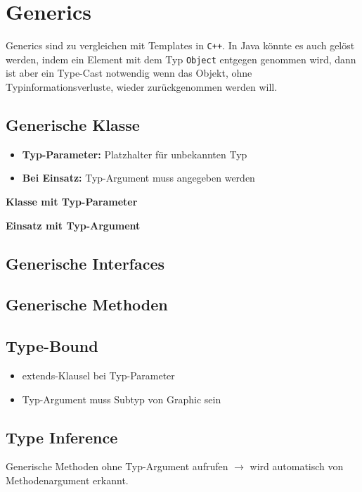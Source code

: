 \section*{Generics}
	Generics sind zu vergleichen mit Templates in \texttt{C++}. In Java könnte es auch gelöst werden, indem ein Element mit dem Typ \texttt{Object} entgegen genommen wird, dann ist aber ein Type-Cast notwendig wenn das Objekt, ohne Typinformationsverluste, wieder zurückgenommen werden will.
	\subsection*{Generische Klasse}
		\begin{minipage}[t]{8.5cm}
			\begin{itemize}[noitemsep]
				\item \textbf{Typ-Parameter:} Platzhalter für unbekannten Typ
				\item \textbf{Bei Einsatz:} Typ-Argument muss angegeben werden
			\end{itemize}
		\end{minipage}
		\hspace*{0.25cm}
		\begin{minipage}[t]{4.2cm}
			\textbf{Klasse mit Typ-Parameter}	
			
		\end{minipage}
		\hspace*{0.25cm}
		\begin{minipage}[t]{5.3cm}
			\textbf{Einsatz mit Typ-Argument}
			
		\end{minipage}
	\begin{minipage}[t]{7cm}
		\subsection*{Generische Interfaces}
		
	\end{minipage}
	\hspace*{0.5cm}
	\begin{minipage}[t]{11.3cm}
		\subsection*{Generische Methoden}
		
	\end{minipage}
	\begin{minipage}[t]{9cm}
		\subsection*{Type-Bound}
		\begin{itemize}[noitemsep]
			\item extends-Klausel bei Typ-Parameter
			\item Typ-Argument muss Subtyp von Graphic sein
		\end{itemize}
		
	\end{minipage}
	\hspace*{0.5cm}
	\begin{minipage}[t]{9.3cm}
		\subsection*{Type Inference}
		Generische Methoden ohne Typ-Argument aufrufen $\rightarrow$ wird automatisch von Methodenargument erkannt.
		
	\end{minipage}
	